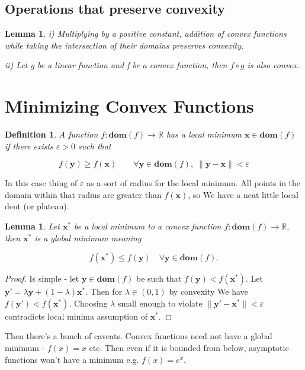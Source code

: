 \documentclass{article}
\newtheorem{definition}[theorem]{Definition}
\newtheorem{lemma}[theorem]{Lemma}
\begin{document}
	\subsection{Operations that preserve convexity}
	
		\begin{lemma}
			i) Multiplying by a positive constant, addition of convex functions while taking the intersection of their domains preserves convexity.
			
			ii) Let g be a linear function and f be a convex function, then $f\circ g$ is also convex.
		\end{lemma}

\section{Minimizing Convex Functions}

	\begin{definition}
		A function $f:\mathbf{dom}(f)\to\mathbb{R}$ has a local minimum $\mathbf{x}\in\mathbf{dom}(f)$ if there exists $\varepsilon >0$ such that
		
		\[ f(\mathbf{y}) \ge f(\mathbf{x})\qquad \forall\mathbf{y}\in\mathbf{dom}(f),\; \|\mathbf{y-x}\| < \varepsilon   \]
	\end{definition}
	
	In this case thing of $\varepsilon$ as a sort of radius for the local minimum. All points in the domain within that radius are greater than $f(\mathbf{x})$, so We have a neat little local dent (or plateau).
	
	\begin{lemma}
		Let $\mathbf{x^*}$ be a local minimum to a convex function $f:\mathbf{dom}(f)\to\mathbb{R}$, then       $\mathbf{x^*}$ is a global minimum meaning
		
		\[ f(\mathbf{x^*}) \le f(\mathbf{y})\quad  \forall \mathbf{y}\in\mathbf{dom}(f).\]
	\end{lemma}
	
	\begin{proof}
		Is simple - let $\mathbf{y}\in\mathbf{dom}(f)$ be such that $f(\mathbf{y}) < f(\mathbf{x^*})$. Let $\mathbf{y'} = \lambda\mathbf{y} + (1-\lambda)\mathbf{x^*}$. Then for $\lambda\in (0, 1)$ by convexity We have $f(\mathbf{y'}) < f(\mathbf{x^*})$. Choosing $\lambda$ small enough to violate $\|\mathbf{y' - x^*}\| < \varepsilon$ contradicts local minima assumption of $\mathbf{x^*}$.
	\end{proof}
	
	Then there's a bunch of caveats. Convex functions need not have a global minimum - $f(x) = x$ etc. Then even if it is bounded from below, asymptotic functions won't have a minimum e.g. $f(x) = e^x$.
	
\end{document}
